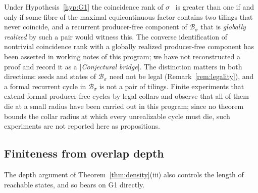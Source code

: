 \documentclass[11pt]{amsart}
\theoremstyle{plain}
\theoremstyle{definition}
\theoremstyle{remark}
\newcommand{\B}{\mathcal{B}}
\newcommand{\Status}[1]{\textup{[\textit{#1}]}}
\begin{document}
Under Hypothesis~\ref{hyp:G1} the coincidence rank of $\sigma$~\cite{BK,Barge2016} is greater than one if and only if some fibre of the maximal equicontinuous factor contains two tilings that never coincide, and a recurrent producer-free component of $\B_\sigma$ that is \emph{globally realized} by such a pair would witness this. The converse identification of nontrivial coincidence rank with a globally realized producer-free component has been asserted in working notes of this program; we have not reconstructed a proof and record it as a \Status{Conjectural bridge}. The distinction matters in both directions: seeds and states of $\B_\sigma$ need not be legal (Remark~\ref{rem:legality}), and a formal recurrent cycle in $\B_\sigma$ is not a pair of tilings. Finite experiments that extend formal producer-free cycles by legal collars and observe that all of them die at a small radius have been carried out in this program; since no theorem bounds the collar radius at which every unrealizable cycle must die, such experiments are not reported here as propositions.

\subsection{Finiteness from overlap depth}\label{sec:G1-from-overlaps}

The depth argument of Theorem~\ref{thm:density}(iii) also controls the length of reachable states, and so bears on G1 directly.
\end{document}
